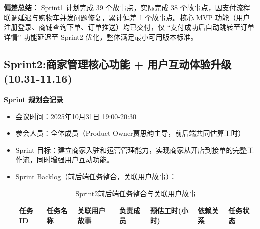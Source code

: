 \begin{levellist}
\begin{enumerate}
\begin{itemize}
              \end{itemize}

    \end{enumerate}
    \textbf{偏差总结：} Sprint1 计划完成 39 个故事点，实际完成 38 个故事点，因支付流程联调延迟与购物车并发问题修复，累计偏差 1 个故事点。核心 MVP 功能（用户注册登录、商铺查询下单、订单推送）均已交付，仅 “支付成功后自动跳转至订单详情” 功能延迟至 Sprint2 优化，整体满足最小可用版本标准。

\end{levellist}


\subsection{Sprint2:商家管理核心功能 + 用户互动体验升级(10.31-11.16)}

\begin{levellist}
    \item \textbf{Sprint 规划会记录}
    \begin{itemize}
        \item 会议时间：2025年10月31日 19:00-20:30
        \item 参会人员：全体成员（Product Owner贾思韵主导，前后端共同估算工时）
        \item Sprint 目标：建立商家入驻和运营管理能力，实现商家从开店到接单的完整工作流，同时增强用户互动功能。
        \item Sprint Backlog（前后端任务整合，关联用户故事）：

              \begin{longtable}{>{\centering\arraybackslash}m{1.4cm} >{\centering\arraybackslash}m{3.1cm} >{\centering\arraybackslash}m{1.7cm} >{\centering\arraybackslash}m{1.8cm} >{\centering\arraybackslash}m{1.8cm} >{\centering\arraybackslash}m{1.3cm} >{\centering\arraybackslash}m{1.2cm}}

                  \caption{Sprint2前后端任务整合与关联用户故事} \label{tab:training}                                                                                                                    \\

                  \toprule
                  \textbf{任务ID} & \textbf{任务名称}                                                  & \textbf{关联用户故事} & \textbf{负责成员} & \textbf{预估工时(小时)} & \textbf{依赖关系}    & \textbf{任务状态} \\
                  \midrule
                  \endfirsthead


\end{longtable}
\end{itemize}
\end{levellist}
